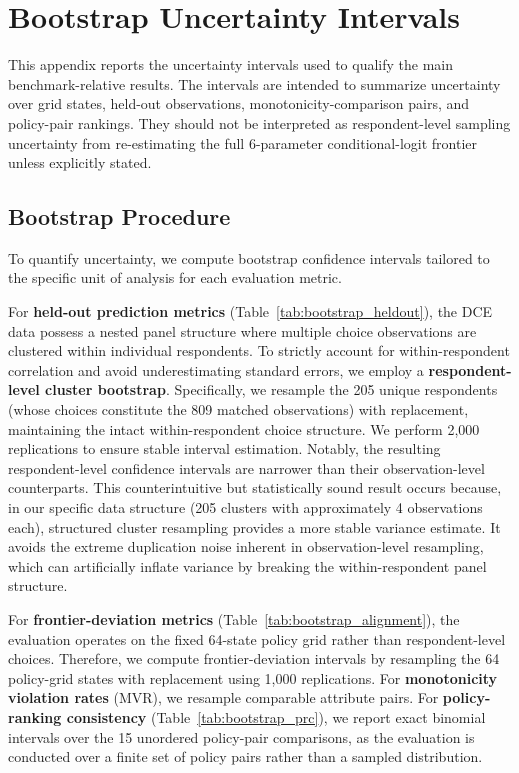 \documentclass[11pt]{article}
\begin{document}
\section{Bootstrap Uncertainty Intervals}
\label{app:bootstrap}

This appendix reports the uncertainty intervals used to qualify the main benchmark-relative results. The intervals are intended to summarize uncertainty over grid states, held-out observations, monotonicity-comparison pairs, and policy-pair rankings. They should not be interpreted as respondent-level sampling uncertainty from re-estimating the full 6-parameter conditional-logit frontier unless explicitly stated.

\subsection{Bootstrap Procedure}
\label{app:bootstrap_procedure}

To quantify uncertainty, we compute bootstrap confidence intervals tailored to the specific unit of analysis for each evaluation metric. 

For \textbf{held-out prediction metrics} (Table~\ref{tab:bootstrap_heldout}), the DCE data possess a nested panel structure where multiple choice observations are clustered within individual respondents. To strictly account for within-respondent correlation and avoid underestimating standard errors, we employ a \textbf{respondent-level cluster bootstrap}. Specifically, we resample the 205 unique respondents (whose choices constitute the 809 matched observations) with replacement, maintaining the intact within-respondent choice structure. We perform 2,000 replications to ensure stable interval estimation. Notably, the resulting respondent-level confidence intervals are narrower than their observation-level counterparts. This counterintuitive but statistically sound result occurs because, in our specific data structure (205 clusters with approximately 4 observations each), structured cluster resampling provides a more stable variance estimate. It avoids the extreme duplication noise inherent in observation-level resampling, which can artificially inflate variance by breaking the within-respondent panel structure.

For \textbf{frontier-deviation metrics} (Table~\ref{tab:bootstrap_alignment}), the evaluation operates on the fixed 64-state policy grid rather than respondent-level choices. Therefore, we compute frontier-deviation intervals by resampling the 64 policy-grid states with replacement using 1,000 replications. For \textbf{monotonicity violation rates} (MVR), we resample comparable attribute pairs. For \textbf{policy-ranking consistency} (Table~\ref{tab:bootstrap_prc}), we report exact binomial intervals over the 15 unordered policy-pair comparisons, as the evaluation is conducted over a finite set of policy pairs rather than a sampled distribution.
\end{document}
